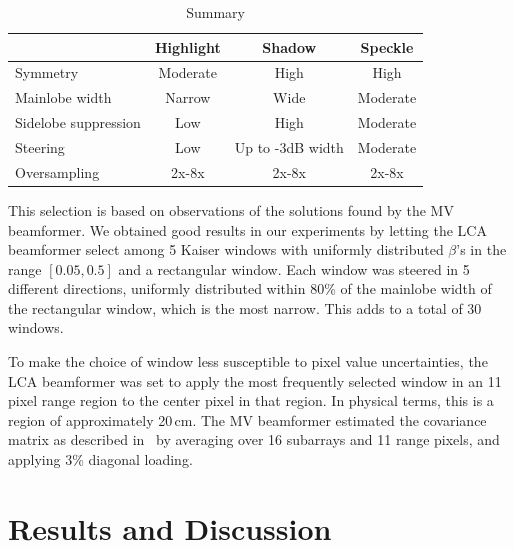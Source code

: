 \documentclass[10pt,journal,draftclsnofoot,onecolumn]{IEEEtran}
\let\MYoriglatexcaption\caption               %
\renewcommand{\caption}[2][\relax]{\MYoriglatexcaption[#2]{#2}}
\newcommand\1{\vec 1}
\begin{document}
\begin{table}[!b]\centering%
\begin{tabular}[c]{l c c c}\hline
\rowcolor{tabBlue} & \bf Highlight & \bf Shadow & \bf Speckle  \\\hline
Symmetry             & Moderate  & High   & High \\
Mainlobe width       & Narrow    & Wide   & Moderate \\
Sidelobe suppression & Low       & High   & Moderate \\
Steering             & Low       & Up to -3dB width & Moderate \\
Oversampling         & 2x-8x     & 2x-8x  & 2x-8x
\end{tabular}
\caption{Summary}\label{tab:summary}
\end{table}%

This selection is based on observations of the solutions found by the MV beamformer. We obtained good results in our experiments by letting the LCA beamformer select among 5 Kaiser windows with uniformly distributed $\beta$'s in the range $[0.05, 0.5]$ and a rectangular window. Each window was steered in 5 different directions, uniformly distributed within 80\% of the mainlobe width of the rectangular window, which is the most narrow. This adds to a total of 30 windows.

To make the choice of window less susceptible to pixel value uncertainties, the LCA beamformer was set to apply the most frequently selected window in an 11 pixel range region to the center pixel in that region. In physical terms, this is a region of approximately 20\,cm. The MV beamformer estimated the covariance matrix as described in~\cite{syn07} by averaging over 16 subarrays and 11 range pixels, and applying 3\% diagonal loading.



\section{Results and Discussion}
\end{document}
